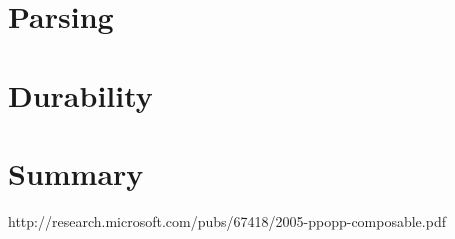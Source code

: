 \documentclass[10.75pt]{article}
\begin{document}
\begin{multicols}{2}
\section{Parsing}

\section{Durability}

\section{Summary}


\end{multicols}

\begin{thebibliography}{11}

 http://research.microsoft.com/pubs/67418/2005-ppopp-composable.pdf

\end{thebibliography}
\end{document}
